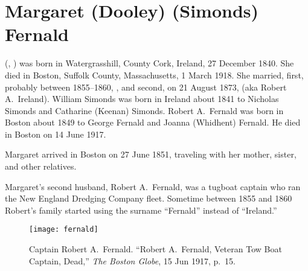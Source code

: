 \section{Margaret (Dooley) (Simonds) Fernald}\label{per:Margaret3Dooley}

 (, ) was born in Watergrasshill, County Cork, Ireland, 27 December 1840.\cite{Margaret3DooleyBaptism} She died in Boston, Suffolk County, Massachusetts, 1 March 1918.\cite{Margaret3DooleyDeath} She married, first, probably between 1855--1860, ,\cite{WilliamSimondsMarriage} and second, on 21 August 1873, \cite{RobertFernaldMarriage} (aka Robert A.\ Ireland).\cite{Census1855RobertFernald} William Simonds was born in Ireland about 1841\cite{Census1855WilliamSimonds} to Nicholas Simonds and Catharine (Keenan) Simonds.\cite{WilliamSimondsDeath,CatharineSimondsDeath} Robert A.\ Fernald was born in Boston about 1849 to George Fernald and Joanna (Whidhent) Fernald.\cite{RobertFernaldMarriage,JoannaFernaldDeath} He died in Boston on 14 June 1917.\cite{RobertFernaldDeath}

Margaret arrived in Boston on 27 June 1851, traveling with her mother, sister, and other relatives.\cite{Chascay}

Margaret's second husband, Robert A.\ Fernald, was a tugboat captain who ran the New England Dredging Company fleet.\cite{RobertFernaldDeath} Sometime between 1855 and 1860 Robert's family started using the surname ``Fernald'' instead of ``Ireland.''\cite{Census1855RobertFernald,Census1860RobertFernald}

\begin{figure}
	\centering
	\texttt{[image: fernald]}
	\caption{Captain Robert A.\ Fernald. ``Robert A.\ Fernald, Veteran Tow Boat Captain, Dead,'' \textit{The Boston Globe}, 15 Jun 1917, p.\ 15.}
\end{figure}

